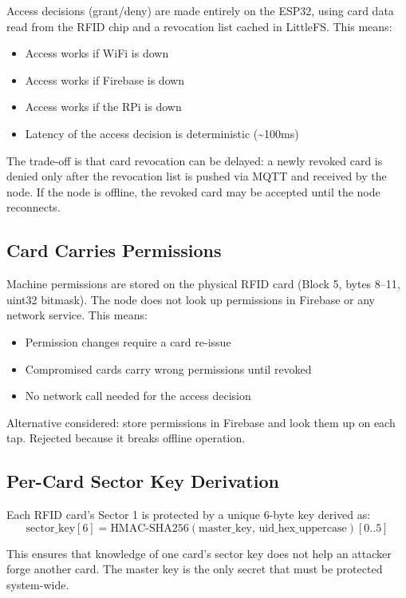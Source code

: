 Access decisions (grant/deny) are made entirely on the ESP32, using card data read from the RFID chip and a revocation list cached in LittleFS. This means:
\begin{itemize}[leftmargin=1.5em]
    \item Access works if WiFi is down
    \item Access works if Firebase is down
    \item Access works if the RPi is down
    \item Latency of the access decision is deterministic (\textasciitilde{}100ms)
\end{itemize}

The trade-off is that card revocation can be delayed: a newly revoked card is denied only after the revocation list is pushed via MQTT and received by the node. If the node is offline, the revoked card may be accepted until the node reconnects.

\subsection{Card Carries Permissions}

Machine permissions are stored on the physical RFID card (Block 5, bytes 8--11, uint32 bitmask). The node does not look up permissions in Firebase or any network service. This means:
\begin{itemize}[leftmargin=1.5em]
    \item Permission changes require a card re-issue
    \item Compromised cards carry wrong permissions until revoked
    \item No network call needed for the access decision
\end{itemize}

Alternative considered: store permissions in Firebase and look them up on each tap. Rejected because it breaks offline operation.

\subsection{Per-Card Sector Key Derivation}

Each RFID card's Sector 1 is protected by a unique 6-byte key derived as:
\[
\text{sector\_key}[6] = \text{HMAC-SHA256}(\text{master\_key},\, \text{uid\_hex\_uppercase})[0..5]
\]

This ensures that knowledge of one card's sector key does not help an attacker forge another card. The master key is the only secret that must be protected system-wide.

